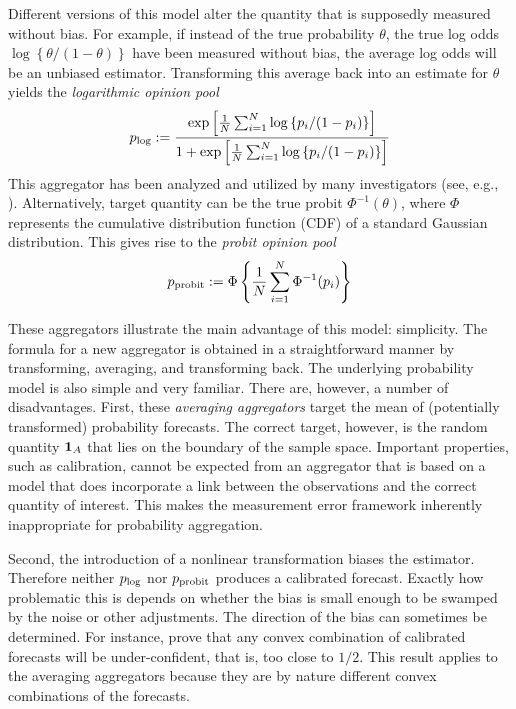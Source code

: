 \documentclass[11pt]{article}
\theoremstyle{definition}
\theoremstyle{definition}
\def\one{{\bf 1}}
\def\probit{p_{\rm probit}}
\def\plog{p_{\rm log}}
\begin{document}
Different versions of this model alter the quantity that is supposedly 
measured without bias. For example, if instead of the true probability $\theta$,
the true log odds $\log\left\{\theta/(1-\theta)\right\}$ have been measured without bias, 
the average log odds will be an unbiased estimator. Transforming this average back into
an estimate for $\theta$ yields the {\em logarithmic opinion pool}
$$\plog := \frac{\exp \left [ \frac{1}{N} \sum_{i=1}^N
   \log \left\{ p_i / (1-p_i) \right\} \right ]}
{1 + \exp \left [ \frac{1}{N} \sum_{i=1}^N
   \log \left\{p_i / (1-p_i)\right\} \right ]} $$
This aggregator has been analyzed and utilized by many investigators
(see, e.g., \citealt{dawid1995coherent, Genest, bacharach1975group}). Alternatively, target quantity can be the true probit $\Phi^{-1}(\theta)$, where $\Phi$ represents the cumulative distribution function (CDF) of a standard Gaussian distribution. This gives rise to the {\em probit opinion pool} 
$$\probit := \Phi \left\{ \frac{1}{N} \sum_{i=1}^N \Phi^{-1}
   (p_i) \right \} $$

These aggregators illustrate the main advantage of this model: simplicity.  The formula
for a new aggregator is obtained in a straightforward manner by 
transforming, averaging, and transforming back.  The underlying probability
model is also simple and very familiar.  There are, however, a number
of disadvantages.  First, these \textit{averaging aggregators} target the mean of (potentially transformed) probability forecasts. The correct target, however, is the random quantity $\one_A$ that lies on the boundary of the sample space. Important properties, such as calibration, cannot be expected from an aggregator that is based on a model that does incorporate a link between the observations and the correct quantity of interest. This makes the measurement error framework inherently inappropriate for probability aggregation. 


Second, the introduction of a nonlinear 
transformation biases the estimator.  Therefore neither $\plog$ 
nor $\probit$ produces a calibrated forecast. Exactly how
problematic this is depends on whether the bias is small enough
to be swamped by the noise or other adjustments.  The direction of
the bias can sometimes be determined. For instance, \citet{Ranjan08} prove that any convex combination of calibrated forecasts will be under-confident, that is, too close to $1/2$. This result applies to the averaging aggregators because they are by nature different convex combinations of the forecasts. 
\end{document}
